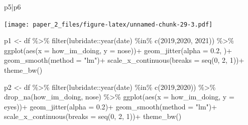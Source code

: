 \documentclass[
]{article}
\newenvironment{Shaded}{\begin{snugshade}}{\end{snugshade}}
\newcommand{\AttributeTok}[1]{\textcolor[rgb]{0.77,0.63,0.00}{#1}}
\newcommand{\DecValTok}[1]{\textcolor[rgb]{0.00,0.00,0.81}{#1}}
\newcommand{\FloatTok}[1]{\textcolor[rgb]{0.00,0.00,0.81}{#1}}
\newcommand{\FunctionTok}[1]{\textcolor[rgb]{0.00,0.00,0.00}{#1}}
\newcommand{\NormalTok}[1]{#1}
\newcommand{\OtherTok}[1]{\textcolor[rgb]{0.56,0.35,0.01}{#1}}
\newcommand{\SpecialCharTok}[1]{\textcolor[rgb]{0.00,0.00,0.00}{#1}}
\newcommand{\StringTok}[1]{\textcolor[rgb]{0.31,0.60,0.02}{#1}}
\begin{document}
\begin{Shaded}
\begin{Highlighting}[]
\NormalTok{p5}\SpecialCharTok{|}\NormalTok{p6}
\end{Highlighting}
\end{Shaded}

\texttt{[image: paper\_2\_files/figure-latex/unnamed-chunk-29-3.pdf]}

\begin{Shaded}
\begin{Highlighting}[]
\NormalTok{p1 }\OtherTok{\textless{}{-}}\NormalTok{ df }\SpecialCharTok{\%\textgreater{}\%}
  \FunctionTok{filter}\NormalTok{(lubridate}\SpecialCharTok{::}\FunctionTok{year}\NormalTok{(date) }\SpecialCharTok{\%in\%} \FunctionTok{c}\NormalTok{(}\DecValTok{2019}\NormalTok{,}\DecValTok{2020}\NormalTok{, }\DecValTok{2021}\NormalTok{)) }\SpecialCharTok{\%\textgreater{}\%}
  \FunctionTok{ggplot}\NormalTok{(}\FunctionTok{aes}\NormalTok{(}\AttributeTok{x =}\NormalTok{ how\_im\_doing, }\AttributeTok{y =}\NormalTok{ nose))}\SpecialCharTok{+}
  \FunctionTok{geom\_jitter}\NormalTok{(}\AttributeTok{alpha =} \FloatTok{0.2}\NormalTok{, )}\SpecialCharTok{+}
  \FunctionTok{geom\_smooth}\NormalTok{(}\AttributeTok{method =} \StringTok{"lm"}\NormalTok{)}\SpecialCharTok{+}
  \FunctionTok{scale\_x\_continuous}\NormalTok{(}\AttributeTok{breaks =} \FunctionTok{seq}\NormalTok{(}\DecValTok{0}\NormalTok{, }\DecValTok{2}\NormalTok{, }\DecValTok{1}\NormalTok{))}\SpecialCharTok{+}
  \FunctionTok{theme\_bw}\NormalTok{()}
  
\NormalTok{p2 }\OtherTok{\textless{}{-}}\NormalTok{ df }\SpecialCharTok{\%\textgreater{}\%}
  \FunctionTok{filter}\NormalTok{(lubridate}\SpecialCharTok{::}\FunctionTok{year}\NormalTok{(date) }\SpecialCharTok{\%in\%} \FunctionTok{c}\NormalTok{(}\DecValTok{2019}\NormalTok{,}\DecValTok{2020}\NormalTok{)) }\SpecialCharTok{\%\textgreater{}\%}
  \FunctionTok{drop\_na}\NormalTok{(how\_im\_doing,}
\NormalTok{          nose) }\SpecialCharTok{\%\textgreater{}\%}
  \FunctionTok{ggplot}\NormalTok{(}\FunctionTok{aes}\NormalTok{(}\AttributeTok{x =}\NormalTok{ how\_im\_doing, }\AttributeTok{y =}\NormalTok{ eyes))}\SpecialCharTok{+}
  \FunctionTok{geom\_jitter}\NormalTok{(}\AttributeTok{alpha =} \FloatTok{0.2}\NormalTok{)}\SpecialCharTok{+}
  \FunctionTok{geom\_smooth}\NormalTok{(}\AttributeTok{method =} \StringTok{"lm"}\NormalTok{)}\SpecialCharTok{+}
  \FunctionTok{scale\_x\_continuous}\NormalTok{(}\AttributeTok{breaks =} \FunctionTok{seq}\NormalTok{(}\DecValTok{0}\NormalTok{, }\DecValTok{2}\NormalTok{, }\DecValTok{1}\NormalTok{))}\SpecialCharTok{+}
  \FunctionTok{theme\_bw}\NormalTok{() }
  

\end{Highlighting}
\end{Shaded}
\end{document}
